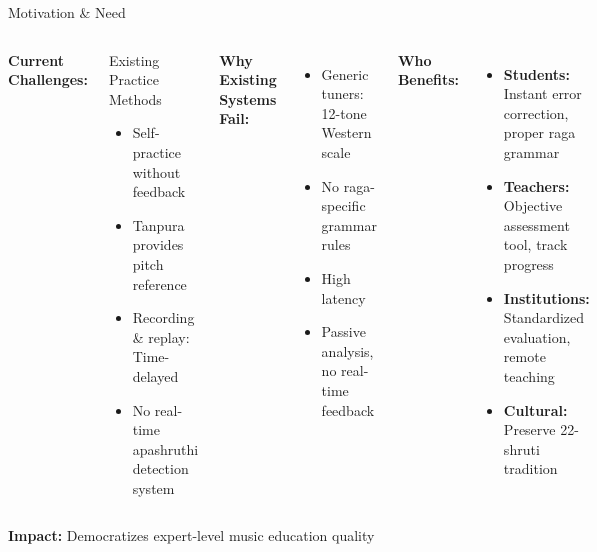 \documentclass[aspectratio=169,11pt]{beamer}
\begin{document}
	\begin{frame}{Motivation \& Need}
		\begin{columns}[t]
			\textbf{Current Challenges:}
			\begin{block}{Existing Practice Methods}
				\begin{itemize}
					\footnotesize
					\item Self-practice without feedback
					\item Tanpura provides pitch reference
					\item Recording \& replay: Time-delayed
					\item No real-time apashruthi detection system
				\end{itemize}
			\end{block}
			
			\textbf{Why Existing Systems Fail:}
			\begin{itemize}
				\footnotesize
				\item Generic tuners: 12-tone Western scale
				\item No raga-specific grammar rules
				\item High latency
				\item Passive analysis, no real-time feedback
			\end{itemize}
			
			\textbf{Who Benefits:}
			\begin{itemize}
				\footnotesize
				\item \textbf{Students:} Instant error correction, proper raga grammar
				\item \textbf{Teachers:} Objective assessment tool, track progress
				\item \textbf{Institutions:} Standardized evaluation, remote teaching
				\item \textbf{Cultural:} Preserve 22-shruti tradition
			\end{itemize}
		\end{columns}
		
		\vspace{0.2cm}
		\textbf{Impact:} Democratizes expert-level music education quality
	\end{frame}
	
\end{document}
